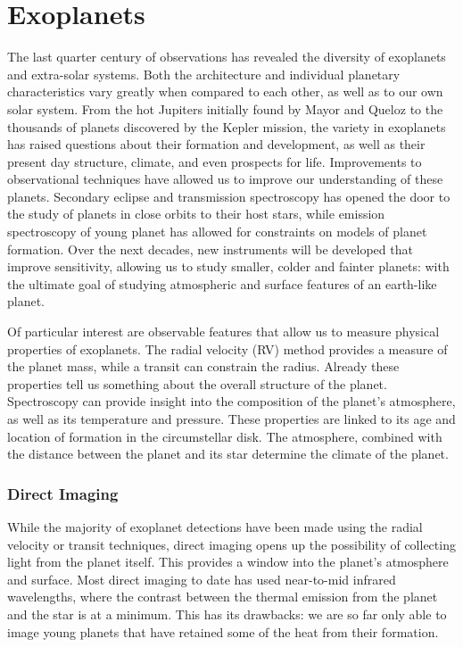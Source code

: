 \section{Exoplanets}
The last quarter century of observations has revealed the diversity of exoplanets and extra-solar systems.
Both the architecture and individual planetary characteristics vary greatly when compared to each other, as well as to our own solar system.
From the hot Jupiters initially found by Mayor and Queloz \autocite{Mayor1995} to the thousands of planets discovered by the Kepler mission, the variety in exoplanets has raised questions about their formation and development, as well as their present day structure, climate, and even prospects for life.
Improvements to observational techniques have allowed us to improve our understanding of these planets.
Secondary eclipse and transmission spectroscopy has opened the door to the study of planets in close orbits to their host stars, while emission spectroscopy of young planet has allowed for constraints on models of planet formation.
Over the next decades, new instruments will be developed that improve sensitivity, allowing us to study smaller, colder and fainter planets: with the ultimate goal of studying atmospheric and surface features of an earth-like planet.

Of particular interest are observable features that allow us to measure physical properties of exoplanets.
The radial velocity (RV) method provides a measure of the planet mass, while a transit can constrain the radius.
Already these properties tell us something about the overall structure of the planet.
Spectroscopy can provide insight into the composition of the planet's atmosphere, as well as its temperature and pressure.
These properties are linked to its age and location of formation in the circumstellar disk.
The atmosphere, combined with the distance between the planet and its star determine the climate of the planet.

\subsubsection{Direct Imaging}
While the majority of exoplanet detections have been made using the radial velocity or transit techniques, direct imaging opens up the possibility of collecting light from the planet itself.
This provides a window into the planet's atmosphere and surface.
Most direct imaging to date has used near-to-mid infrared wavelengths, where the contrast between the thermal emission from the planet and the star is at a minimum.
This has its drawbacks: we are so far only able to image young planets that have retained some of the heat from their formation.

